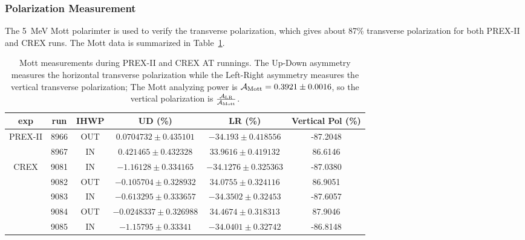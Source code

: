 \subsubsection{Polarization Measurement}
The 5~MeV Mott polarimter is used to verify the transverse polarization,
which gives about 87\% transverse polarization for both PREX-II and CREX runs.
The Mott data is summarized in Table~\ref{tab:AT_Mott}.
\begin{table}[!h]
    \begin{tabular}{c c c | c c | c}
	\hline
	exp & run & IHWP  & UD (\%)	& LR (\%)   & Vertical Pol (\%)	\\
	\hline
	\multirow{2}{*}{PREX-II}
	    & 8966  & OUT   & $0.0704732 \pm 0.435101$	& $-34.193 \pm 0.418556$	& -87.2048  \\
	    & 8967  & IN    & $0.421465 \pm 0.432328$	& $33.9616 \pm 0.419132$	&  86.6146  \\
	\hline
	\multirow{5}{*}{CREX}    
	    & 9081  & IN    & $-1.16128 \pm 0.334165$   & $-34.1276 \pm 0.325363$	& -87.0380  \\
	    & 9082  & OUT   & $-0.105704 \pm 0.328932$	& $34.0755 \pm 0.324116	$&  86.9051  \\
	    & 9083  & IN    & $-0.613295 \pm 0.333657$	& $-34.3502 \pm 0.32453	$& -87.6057  \\
	    & 9084  & OUT   & $-0.0248337 \pm 0.326988$	& $34.4674 \pm 0.318313	$&  87.9046  \\
	    & 9085  & IN    & $-1.15795 \pm 0.33341 $   & $-34.0401 \pm 0.32742	$& -86.8148  \\
	\hline
    \end{tabular}
    \caption[Mott measurement during AT]
    {Mott measurements during PREX-II and CREX AT runnings. The Up-Down
    asymmetry measures the horizontal transverse polarization while the Left-Right
    asymmetry measures the vertical transverse polarization; The Mott analyzing 
    power is $\mathcal{A}_{\text{Mott}} = 0.3921 \pm 0.0016$, so the vertical polarization is 
    $\frac{\mathcal{A}_{\text{LR}}}{\mathcal{A}_{\text{Mott}}}$.} 
    \label{tab:AT_Mott}
\end{table}

